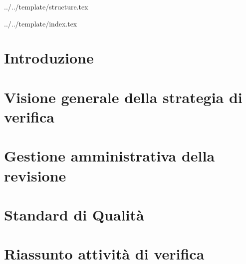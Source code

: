 


\def\DOCUMENTO{Piano di Qualifica}
\def\VERSIONE{1.0.0}

\def\REDATTORE {Bogdan Suierica \\ & Crespan Emanuele}
\def\VERIFICATORE {Burlin Valerio}
\def\RESPONSABILE {Agostinetto Matteo}

\def\USO {Esterno}

\def\DISTRIBUZIONE {\GRUPPO{}\\ & \COMMITTENTE{}\\ & \PROPONENTE{}\\}

\def\DESCRIZIONE {Documento riguardante le strategie di verifica e validazione adottate dal gruppo \GRUPPO\ necessarie ad assicurare i requisiti qualitativi nello svolgimento del progetto \PROGETTO.}


\def\INDICE	{true}
\def\TABELLE {false}
\def\FIGURE {true}


 {../../template/structure.tex}



 {../../template/index.tex}



%

\section{Introduzione}


\newpage
\section{Visione generale della strategia di verifica}


\newpage
\section{Gestione amministrativa della revisione}


\newpage
\section{Standard di Qualità}


\appendix

\newpage
\section{Riassunto attività di verifica}





